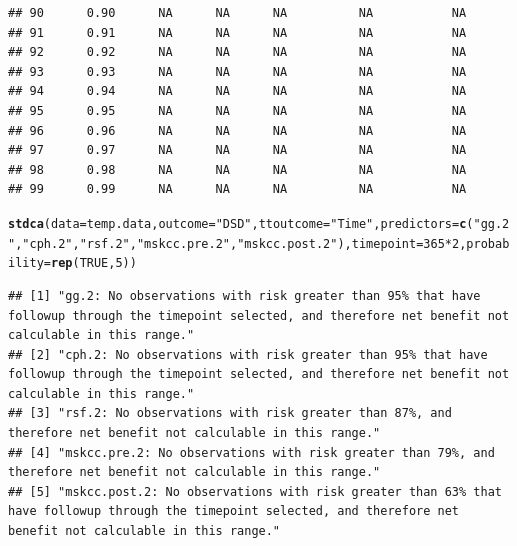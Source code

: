 \documentclass{article}\usepackage[]{graphicx}\usepackage[]{color}
\makeatletter
\newcommand{\hlnum}[1]{\textcolor[rgb]{0.686,0.059,0.569}{#1}}%
\newcommand{\hlstr}[1]{\textcolor[rgb]{0.192,0.494,0.8}{#1}}%
\newcommand{\hlopt}[1]{\textcolor[rgb]{0,0,0}{#1}}%
\newcommand{\hlstd}[1]{\textcolor[rgb]{0.345,0.345,0.345}{#1}}%
\newcommand{\hlkwc}[1]{\textcolor[rgb]{0.333,0.667,0.333}{#1}}%
\newcommand{\hlkwd}[1]{\textcolor[rgb]{0.737,0.353,0.396}{\textbf{#1}}}%
\newenvironment{kframe}{%
 \def\at@end@of@kframe{}%
 \ifinner\ifhmode%
  \def\at@end@of@kframe{\end{minipage}}%
  \begin{minipage}{\columnwidth}%
 \fi\fi%
 \def\FrameCommand##1{\hskip\@totalleftmargin \hskip-\fboxsep
 \colorbox{shadecolor}{##1}\hskip-\fboxsep
     \hskip-\linewidth \hskip-\@totalleftmargin \hskip\columnwidth}%
 \MakeFramed {\advance\hsize-\width
   \@totalleftmargin\z@ \linewidth\hsize
   \@setminipage}}%
 {\par\unskip\endMakeFramed%
 \at@end@of@kframe}
\newenvironment{knitrout}{}{} %
\makeatother
\begin{document}
\begin{knitrout}
\begin{kframe}
\begin{verbatim}
## 90      0.90      NA      NA      NA          NA           NA
## 91      0.91      NA      NA      NA          NA           NA
## 92      0.92      NA      NA      NA          NA           NA
## 93      0.93      NA      NA      NA          NA           NA
## 94      0.94      NA      NA      NA          NA           NA
## 95      0.95      NA      NA      NA          NA           NA
## 96      0.96      NA      NA      NA          NA           NA
## 97      0.97      NA      NA      NA          NA           NA
## 98      0.98      NA      NA      NA          NA           NA
## 99      0.99      NA      NA      NA          NA           NA
\end{verbatim}
\begin{alltt}
\hlkwd{stdca}\hlstd{(}\hlkwc{data} \hlstd{= temp.data,} \hlkwc{outcome} \hlstd{=} \hlstr{"DSD"}\hlstd{,} \hlkwc{ttoutcome} \hlstd{=} \hlstr{"Time"}\hlstd{,} \hlkwc{predictors} \hlstd{=} \hlkwd{c}\hlstd{(}\hlstr{"gg.2"}\hlstd{,} \hlstr{"cph.2"}\hlstd{,} \hlstr{"rsf.2"}\hlstd{,} \hlstr{"mskcc.pre.2"}\hlstd{,} \hlstr{"mskcc.post.2"}\hlstd{),} \hlkwc{timepoint} \hlstd{=} \hlnum{365}\hlopt{*}\hlnum{2}\hlstd{,} \hlkwc{probability} \hlstd{=} \hlkwd{rep}\hlstd{(}\hlnum{TRUE}\hlstd{,} \hlnum{5}\hlstd{))}
\end{alltt}
\begin{verbatim}
## [1] "gg.2: No observations with risk greater than 95% that have followup through the timepoint selected, and therefore net benefit not calculable in this range."        
## [2] "cph.2: No observations with risk greater than 95% that have followup through the timepoint selected, and therefore net benefit not calculable in this range."       
## [3] "rsf.2: No observations with risk greater than 87%, and therefore net benefit not calculable in this range."                                                         
## [4] "mskcc.pre.2: No observations with risk greater than 79%, and therefore net benefit not calculable in this range."                                                   
## [5] "mskcc.post.2: No observations with risk greater than 63% that have followup through the timepoint selected, and therefore net benefit not calculable in this range."
\end{verbatim}
\end{kframe}


\end{knitrout}
\end{document}
